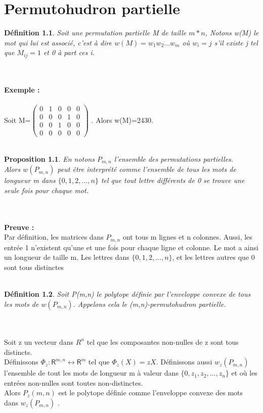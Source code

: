 \documentclass{book}
\newtheorem{petit_nom1}{Proposition}
\newtheorem{petit_nom2}{Définition}[chapter]
\begin{document}
\chapter{Permutohudron partielle}
\begin{petit_nom2}
Soit une permutation partielle M de taille $m*n$, Notons w(M) le mot qui lui est associé, c'est à dire $w(M)=w_1w_2...w_m$ où $w_i=j$ s'il existe j tel que $M_{ij}=1$ et 0 à part ces i.
\end{petit_nom2}\\\\
\textbf{Exemple : }\\\\
Soit M=$\begin{pmatrix}
0&1&0&0&0\\0&0&0&1&0\\0&0&1&0&0\\0&0&0&0&0
\end{pmatrix} $ . Alors w(M)=2430.\\\\
\begin{petit_nom1}
En notons $P_{m,n}$ l'ensemble des permutations partielles. \\
Alors $w(P_{m,n})$ peut être interprété comme l'ensemble de tous les mots de longueur m dans $\{0,1,2,...,n \}$ tel que tout lettre différents de 0 se trouve une seule fois pour chaque mot.
\end{petit_nom1}\\\\
\textbf{Preuve : }\\
Par définition, les matrices dans $P_{m,n}$ ont tous m lignes et n colonnes. Aussi, les entrée 1 n'existent qu'une et une fois pour chaque ligne et colonne. Le mot a ainsi un longueur de taille m. Les lettres dans $\{0,1,2,...,n \}$, et les lettres autres que 0 sont tous distinctes \\\\
\begin{petit_nom2}
Soit P(m,n) le polytope définie par l'enveloppe convexe de tous les mots de $w(P_{m,n})$. Appelons cela le (m,n)-permutohudron partielle. 
\end{petit_nom2}\\\\
Soit z un vecteur dans $R^n$ tel que les composantes non-nulles de z sont tous distincts. \\
Définissons $\Phi_z : \mathsf{R}^{m,n} \longleftrightarrow \mathsf{R}^m $ tel que $\Phi_z (X) = zX $. Définissons aussi $w_z(P_{m,n})$ l'ensemble de tout les mots de longueur m à valeur dans $\{0,z_1,z_2,...,z_n \}$ et où les entrées non-nulles sont toutes non-distinctes. \\ Alors $P_z(m,n)$ est le polytope définie comme l'enveloppe convexe des mots dans $w_z(P_{m,n})$ . \\\\
\end{document}

